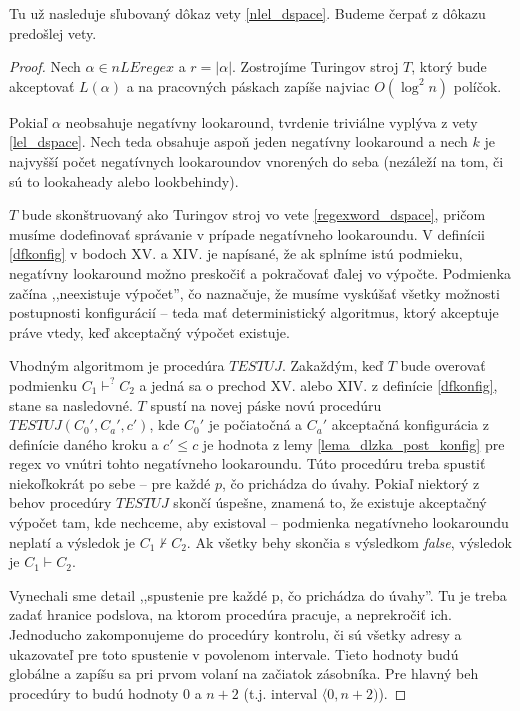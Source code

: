 \documentclass{svk_long_sk}
\def\nle{nLEregex}
\begin{document}
Tu už nasleduje sľubovaný dôkaz vety \ref{nlel_dspace}. Budeme čerpať z dôkazu predošlej vety.
\begin{proof}
Nech $\alpha\in\nle$ a $r=|\alpha|$. Zostrojíme Turingov stroj $T$, ktorý bude akceptovať $L(\alpha)$ a na pracovných páskach zapíše najviac $O(\log^2 n)$ políčok.

Pokiaľ $\alpha$ neobsahuje negatívny lookaround, tvrdenie triviálne vyplýva z vety \ref{lel_dspace}. Nech teda obsahuje aspoň jeden negatívny lookaround a nech $k$ je najvyšší počet negatívnych lookaroundov vnorených do seba (nezáleží na tom, či sú to lookaheady alebo look\-behindy).

$T$ bude skonštruovaný ako Turingov stroj vo vete \ref{regexword_dspace}, pričom musíme dodefinovať správanie v prípade negatívneho lookaroundu. V definícii \ref{dfkonfig} v bodoch XV. a XIV. je napísané, že ak splníme istú podmieku, negatívny lookaround možno preskočiť a pokračovať ďalej vo výpočte. Podmienka začína ,,neexistuje výpočet'', čo naznačuje, že musíme vyskúšať všetky možnosti postupnosti konfigurácií -- teda mať deterministický algoritmus, ktorý akceptuje práve vtedy, keď akceptačný výpočet existuje.

Vhodným algoritmom je procedúra $TESTUJ$. Zakaždým, keď $T$ bude overovať podmienku $C_1\mathop{\vdash}^? C_2$ a jedná sa o prechod XV. alebo XIV. z definície \ref{dfkonfig}, stane sa nasledovné. $T$ spustí na novej páske novú procedúru $TESTUJ(C_0',C_a',c')$, kde $C_0'$ je počiatočná a $C_a'$ akceptačná konfigurácia z definície daného kroku a $c' \leq c$ je hodnota z lemy \ref{lema_dlzka_post_konfig} pre regex vo vnútri tohto negatívneho lookaroundu. Túto procedúru treba spustiť niekoľkokrát po sebe -- pre každé $p$, čo prichádza do úvahy. Pokiaľ niektorý z behov procedúry $TESTUJ$ skončí úspešne, znamená to, že existuje akceptačný výpočet tam, kde nechceme, aby existoval -- podmienka negatívneho lookaroundu neplatí a výsledok je $C_1\nvdash C_2$. Ak všetky behy skončia s výsledkom \textit{false}, výsledok je $C_1\vdash C_2$.

Vynechali sme detail ,,spustenie pre každé p, čo prichádza do úvahy''. Tu je treba zadať hranice podslova, na ktorom procedúra pracuje, a neprekročiť ich. Jednoducho zakomponujeme do procedúry kontrolu, či sú všetky adresy a ukazovateľ pre toto spustenie v povolenom intervale. Tieto hodnoty budú globálne a zapíšu sa pri prvom volaní na začiatok zásobníka. Pre hlavný beh procedúry to budú hodnoty 0 a $n+2$ (t.j. interval $\langle 0,n+2)$).


\end{proof}
\end{document}
